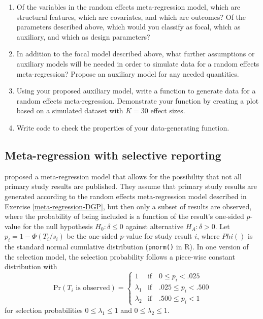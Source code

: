 \documentclass[
]{book}
\begin{document}
\begin{enumerate}
\def\labelenumi{\arabic{enumi}.}
\item
  Of the variables in the random effects meta-regression model, which are structural features, which are covariates, and which are outcomes? Of the parameters described above, which would you classify as focal, which as auxiliary, and which as design parameters?
\item
  In addition to the focal model described above, what further assumptions or auxiliary models will be needed in order to simulate data for a random effects meta-regression? Propose an auxiliary model for any needed quantities.
\item
  Using your proposed auxiliary model, write a function to generate data for a random effects meta-regression. Demonstrate your function by creating a plot based on a simulated dataset with \(K = 30\) effect sizes.
\item
  Write code to check the properties of your data-generating function.
\end{enumerate}

\subsection{Meta-regression with selective reporting}\label{Vevea-Hedges-DGP}

\citet{vevea1995general} proposed a meta-regression model that allows for the possibility that not all primary study results are published.
They assume that primary study results are generated according to the random effects meta-regression model described in Exercise \ref{meta-regression-DGP}, but then only a subset of results are observed, where the probability of being included is a function of the result's one-sided \(p\)-value for the null hypothesis \(H_0: \delta \leq 0\) against alternative \(H_A: \delta > 0\).
Let \(p_i = 1 - \Phi(T_i / s_i)\) be the one-sided \(p\)-value for study result \(i\), where \(Phi()\) is the standard normal cumulative distribution (\texttt{pnorm()} in R).
In one version of the selection model, the selection probability follows a piece-wise constant distribution with
\[
\text{Pr}(T_i \text{ is observed}) = \begin{cases} 
1 & \text{if} \quad 0 \leq p_i < .025 \\ 
\lambda_1 & \text{if} \quad .025 \leq p_i < .500 \\  
\lambda_2 & \text{if} \quad .500 \leq  p_i < 1
\end{cases}
\]
for selection probabilities \(0 \leq \lambda_1 \leq 1\) and \(0 \leq \lambda_2 \leq 1\).
\end{document}
